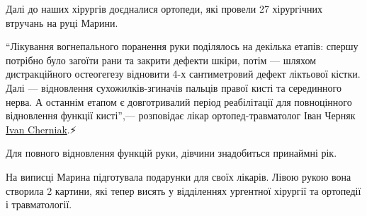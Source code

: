
Далі до наших хірургів доєдналися ортопеди, які провели 27 хірургічних втручань
на руці Марини.🙌🏻

\enquote{Лікування вогнепального поранення руки поділялось на декілька етапів: спершу
потрібно було загоїти рани та закрити дефекти шкіри, потім — шляхом
дистракційного остеогегезу відновити 4-х сантиметровий дефект ліктьової кістки.
Далі — відновлення сухожилків-згиначів пальців правої кисті та серединного
нерва. А останнім етапом є довготривалий період реабілітації для повноцінного
відновлення функції кисті},— розповідає лікар ортопед-травматолог Іван Черняк
\href{https://www.facebook.com/ivan.s.cherniak}{Ivan Cherniak}.⚡️


Для повного відновлення функцій руки, дівчини знадобиться принаймні рік.

На виписці Марина підготувала подарунки для своїх лікарів. Лівою рукою вона
створила 2 картини, які тепер висять у відділеннях ургентної хірургії та
ортопедії і травматології.💛


